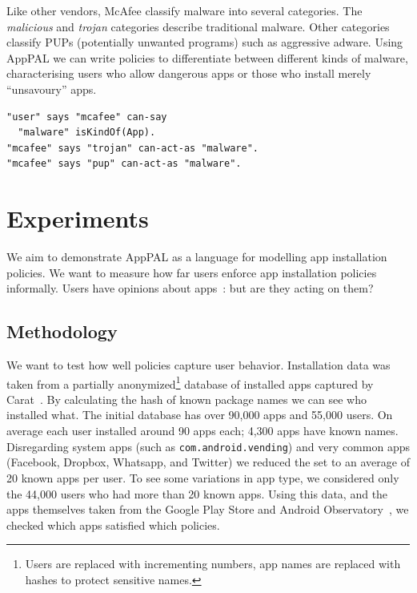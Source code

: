 \documentclass[]{soups-poster}
\newcommand{\citep}[1]{\cite{#1}}
\begin{document}
Like other vendors, McAfee classify malware into several categories.
The \emph{malicious} and \emph{trojan} categories describe traditional malware.
Other categories classify PUPs (potentially unwanted programs) such as aggressive adware.
Using AppPAL we can write policies to differentiate between different kinds of malware,
characterising users who allow dangerous apps or those who install merely ``unsavoury'' apps.
\begin{lstlisting}
"user" says "mcafee" can-say 
  "malware" isKindOf(App).
"mcafee" says "trojan" can-act-as "malware".
"mcafee" says "pup" can-act-as "malware".
\end{lstlisting}

%

\section{Experiments}


We aim to demonstrate AppPAL as a language for modelling app installation policies.
We want to measure how far users enforce app installation policies informally.
Users have opinions about apps~\citep{Sadeh:2014vq}: but are they acting on them?

\subsection{Methodology}

We want to test how well policies capture user behavior.
Installation data was taken from a partially anonymized\footnote{Users are replaced with incrementing numbers, app names are replaced with hashes to protect sensitive names.} database of installed apps captured by Carat~\citep{Oliner:2013ht}.
By calculating the hash of known package names we can see who installed what.
%
The initial database has over 90,000 apps and 55,000 users.
On average each user installed around 90 apps each; 4,300 apps have known names.
Disregarding system apps (such as \texttt{com.android.vending}) and very common apps (Facebook, Dropbox, Whatsapp, and Twitter) we reduced the set to an average of 20 known apps per user.
To see some variations in app type, we considered only the 44,000 users who had more than 20 known apps.
Using this data, and the apps themselves taken from the Google Play Store and Android Observatory~\citep{Barrera:2012iba}, we checked which apps satisfied which policies.
\end{document}
